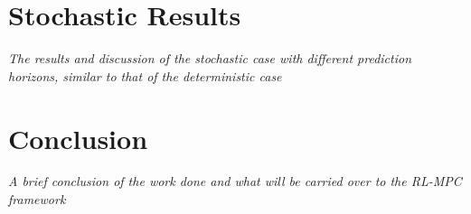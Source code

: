 \section{Stochastic Results}
\emph{The results and discussion of the stochastic case with different prediction horizons, similar to that of the deterministic case}


\section{Conclusion}
\emph{A brief conclusion of the work done and what will be carried over to the RL-MPC framework}